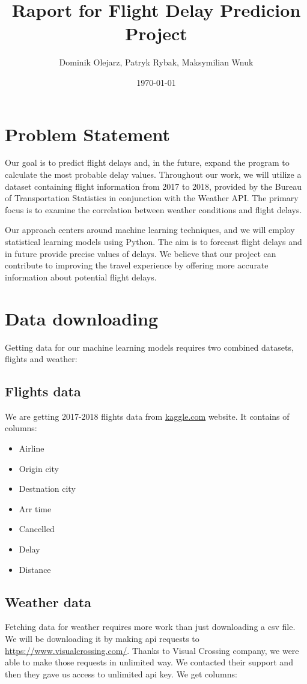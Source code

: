 \documentclass{article}
\title{Raport for Flight Delay Predicion Project} %
\author{Dominik Olejarz, Patryk Rybak, Maksymilian Wnuk} %
\date{\today} %
\begin{document}
 \maketitle
    
 \section{Problem Statement} %

Our goal is to predict flight delays and, in the future, expand the program to calculate the most probable delay values. Throughout our work, we will utilize a dataset containing flight information from 2017 to 2018, provided by the Bureau of Transportation Statistics in conjunction with the Weather API. The primary focus is to examine the correlation between weather conditions and flight delays.

Our approach centers around machine learning techniques, and we will employ statistical learning models using Python. The aim is to forecast flight delays and in future provide precise values of delays. We believe that our project can contribute to improving the travel experience by offering more accurate information about potential flight delays.

    
 \section{Data downloading}
Getting data for our machine learning models requires two combined datasets, 
flights and weather:
	\subsection{Flights data}
		We are getting 2017-2018 flights data from \url{kaggle.com} website.
		It contains of columns:	
			\begin{itemize}
\item Airline 
\item Origin city 
\item Destnation city
\item Arr time  
\item Cancelled 
\item Delay  
\item Distance  
				
			\end{itemize}

	\subsection{Weather data}
		Fetching data for weather requires more work than just downloading a csv file.
		We will be downloading it by making api requests to \url{https://www.visualcrossing.com/}.
		Thanks to Visual Crossing company, we were able to make those requests in unlimited way.
		We contacted their support and then they gave us access to unlimited api key. We
		get columns:
\end{document}

